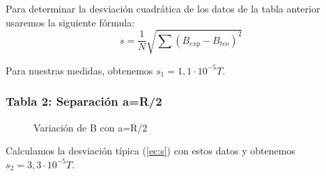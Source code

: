 \documentclass[12pt, a4paper, titlepage]{article}
\begin{document}
  Para determinar la desviación cuadrática de los datos de la tabla anterior usaremos la siguiente fórmula:
  \begin{equation}
    s = \frac{1}{N} \sqrt{\sum{\left(B_{exp} - B_{teo}\right)^2}} \label{ec:s}
  \end{equation}

  Para nuestras medidas, obtenemos $s_1 = 1,1 \cdot 10^{-5} T$.

  \vspace{1cm}

  \begin{minipage}{0.49\textwidth}
    \subsubsection{Tabla 2: Separación a=R/2}

    \begin{figure}[H]
      \begin{table}[H]
         \quad
      \end{table}
      \caption{Variación de B con a=R/2}
    \end{figure}

    Calculamos la desviación típica (\ref{ec:s}) con estos datos y obtenemos $s_2 = 3,3 \cdot 10^{-5} T$.
  \end{minipage} \hfill
\end{document}
